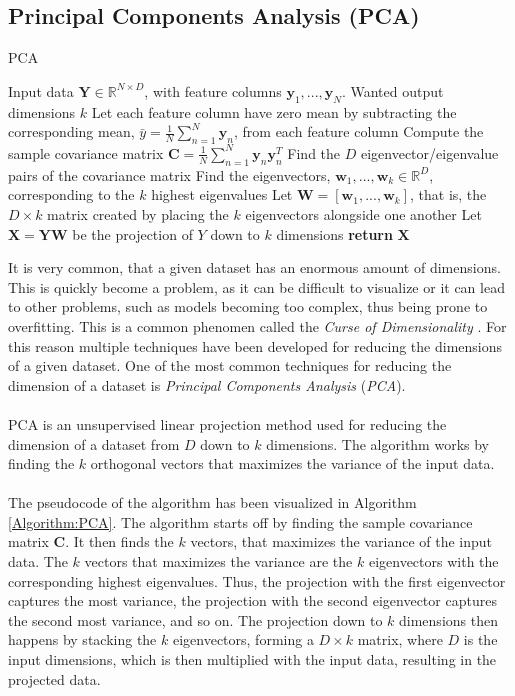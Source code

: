 \documentclass[./main.tex]{subfiles}
\begin{document}
\subsection{Principal Components Analysis (PCA)}
\begin{algorithm}[t]
    \caption{PCA \cite{MAD_book}}
    \begin{algorithmic}[1]
        \Require Input data $\bm{Y} \in \mathbb{R}^{N \times D}$, with feature columns $\bm{y}_1, ..., \bm{y}_N$.
        \Require Wanted output dimensions $k$
        \State Let each feature column have zero mean by subtracting the corresponding mean, $\bar{y} = \frac{1}{N} \sum_{n = 1} ^N \bm{y}_n$, from each feature column
        \State Compute the sample covariance matrix $\bm{C} = \frac{1}{N} \sum_{n = 1} ^N \bm{y}_n \bm{y}_n ^T$ 
        \State Find the $D$ eigenvector/eigenvalue pairs of the covariance matrix
        \State Find the eigenvectors, $\bm{w}_1, ..., \bm{w}_k \in \mathbb{R}^D$, corresponding to the $k$ highest eigenvalues
        \State Let $\bm{W} = \left[ \bm{w}_1, ..., \bm{w}_k \right]$, that is, the $D \times k$ matrix created by placing the $k$ eigenvectors alongside one another
        \State Let $\bm{X} = \bm{Y} \bm{W}$ be the projection of $Y$ down to $k$ dimensions
        \State \textbf{return} $\bm{X}$
    \end{algorithmic}
    \label{Algorithm:PCA}
\end{algorithm}

It is very common, that a given dataset has an enormous amount of dimensions. This is quickly become a problem, as it can be difficult to visualize or it can lead to other problems, such as models becoming too complex, thus being prone to overfitting. This is a common phenomen called the \textit{Curse of Dimensionality} \cite{ESL}. For this reason multiple techniques have been developed for reducing the dimensions of a given dataset. One of the most common techniques for reducing the dimension of a dataset is \textit{Principal Components Analysis} (\textit{PCA}).
\\
\\
PCA is an unsupervised linear projection method used for reducing the dimension of a dataset from $D$ down to $k$ dimensions. The algorithm works by finding the $k$ orthogonal vectors that maximizes the variance of the input data. \cite{MAD_book} 
\\
\\
The pseudocode of the algorithm has been visualized in Algorithm \ref{Algorithm:PCA}. The algorithm starts off by finding the sample covariance matrix $\bm{C}$. It then finds the $k$ vectors, that maximizes the variance of the input data. The $k$ vectors that maximizes the variance are the $k$ eigenvectors with the corresponding highest eigenvalues. Thus, the projection with the first eigenvector captures the most variance, the projection with the second eigenvector captures the second most variance, and so on. The projection down to $k$ dimensions then happens by stacking the $k$ eigenvectors, forming a $D \times k$ matrix, where $D$ is the input dimensions, which is then multiplied with the input data, resulting in the projected data. \cite{MAD_book}
\end{document}
